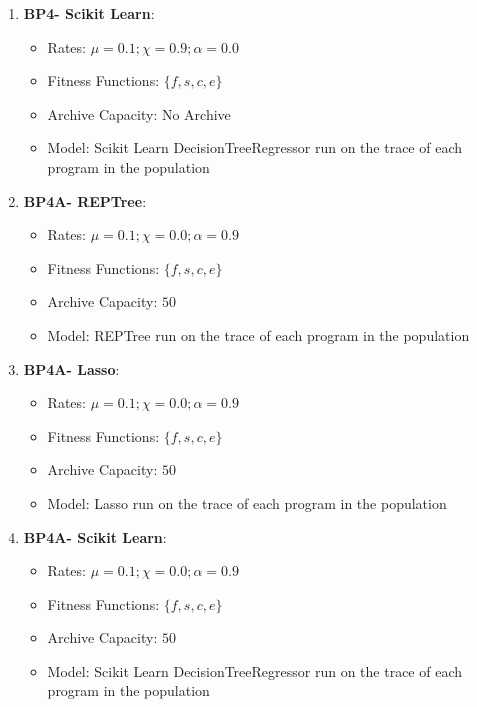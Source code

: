 \begin{enumerate}
\item \textbf{BP4- Scikit Learn}: 
\begin{itemize}[noitemsep]
\item Rates: $\mu = 0.1; \chi = 0.9; \alpha = 0.0$
\item Fitness Functions: $\{f, s, c, e\}$
\item Archive Capacity: No Archive
\item Model: Scikit Learn DecisionTreeRegressor run on the trace of each program in the population
\end{itemize}


\item \textbf{BP4A- REPTree}: 
\begin{itemize}[noitemsep]
\item Rates: $\mu = 0.1; \chi = 0.0; \alpha = 0.9$
\item Fitness Functions: $\{f, s, c, e\}$
\item Archive Capacity: $50$
\item Model: REPTree run on the trace of each program in the population
\end{itemize}

\item \textbf{BP4A- Lasso}: 
\begin{itemize}[noitemsep]
\item Rates: $\mu = 0.1; \chi = 0.0; \alpha = 0.9$
\item Fitness Functions: $\{f, s, c, e\}$
\item Archive Capacity: $50$
\item Model: Lasso run on the trace of each program in the population
\end{itemize}

\item \textbf{BP4A- Scikit Learn}: 
\begin{itemize}[noitemsep]
\item Rates: $\mu = 0.1; \chi = 0.0; \alpha = 0.9$
\item Fitness Functions: $\{f, s, c, e\}$
\item Archive Capacity: $50$
\item Model: Scikit Learn DecisionTreeRegressor run on the trace of each program in the population
\end{itemize}


\end{enumerate}
